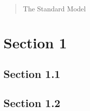 \documentclass[a4paper]{article}
\begin{document}
  
 
\maketitle

\begin{abstract}
    The Standard Model 
\end{abstract}

\tableofcontents
\newpage

\section{Section 1}
\lipsum
\subsection{Section 1.1}
\lipsum 
\lipsum
\subsection{Section 1.2}
\lipsum 
\lipsum

\nocite{tsmlecture} 
\printbibliography

\immediate{}
\end{document}

